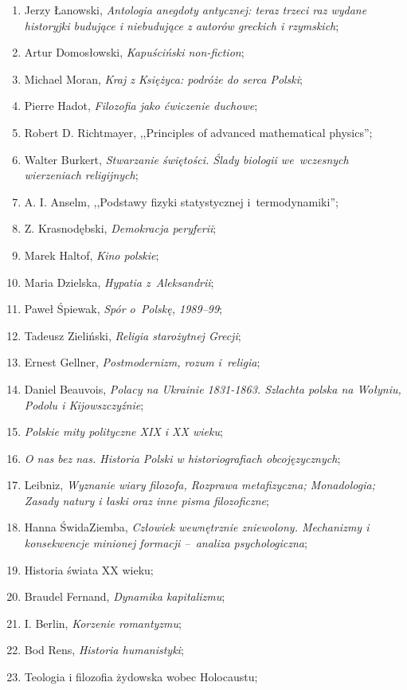 \documentclass[a4paper,11pt]{article}
\begin{document}
\begin{enumerate}
{    historiograficzne};
\item Jerzy Łanowski, \emph{Antologia anegdoty antycznej: teraz trzeci
    raz wydane historyjki budujące i niebudujące z autorów greckich i
    rzymskich};
\item Artur Domosłowski, \emph{Kapuściński non-fiction};
\item Michael Moran, \emph{Kraj z Księżyca: podróże do serca Polski};
\item Pierre Hadot, \emph{Filozofia jako ćwiczenie duchowe};
\item Robert D. Richtmayer, ,,Principles of advanced mathematical
  physics'';
\item Walter Burkert, \emph{Stwarzanie świętości. Ślady biologii
    we~wczesnych wierzeniach religijnych};
\item A. I. Anselm, ,,Podstawy fizyki statystycznej i~termodynamiki'';
\item Z. Krasnodębski, \emph{Demokracja peryferii};
\item Marek Haltof, \emph{Kino polskie};
\item Maria Dzielska, \emph{Hypatia z~Aleksandrii};
\item Paweł Śpiewak, \emph{Spór o~Polskę, 1989--99};
\item Tadeusz Zieliński, \emph{Religia starożytnej Grecji};
\item Ernest Gellner, \emph{Postmodernizm, rozum i~religia};
\item Daniel Beauvois, \emph{Polacy na Ukrainie 1831-1863. Szlachta
    polska na Wołyniu, Podolu i Kijowszczyźnie};
\item \emph{Polskie mity polityczne XIX i XX wieku};
\item \emph{O nas bez nas. Historia Polski w historiografiach
    obcojęzycznych};
\item Leibniz, \emph{Wyznanie wiary filozofa, Rozprawa metafizyczna;
    Monadologia; Zasady natury i łaski oraz inne pisma filozoficzne};
\item Hanna Świda\dywiz Ziemba, \emph{Człowiek wewnętrznie zniewolony.
    Mechanizmy i konsekwencje minionej formacji --~analiza
    psychologiczna};
\item Historia świata XX wieku;
\item Braudel Fernand, \emph{Dynamika kapitalizmu};
\item I. Berlin, \emph{Korzenie romantyzmu};
\item Bod Rens, \emph{Historia humanistyki};
\item Teologia i filozofia żydowska wobec Holocaustu;

\end{enumerate}
\end{document}
